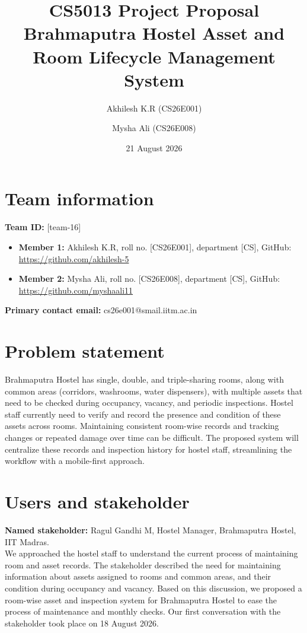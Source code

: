 \documentclass[11pt,a4paper]{article}
\title{CS5013 Project Proposal \\ Brahmaputra Hostel Asset and Room Lifecycle Management System}
\author{Akhilesh K.R (CS26E001) \and Mysha Ali (CS26E008)}
\date{21 August 2026}
\begin{document}
\maketitle

\section{Team information}
\textbf{Team ID:} [team-16]
\begin{itemize}[noitemsep]
    \item \textbf{Member 1:} Akhilesh K.R, roll no. [CS26E001], department [CS], GitHub: \url{https://github.com/akhilesh-5}
    \item \textbf{Member 2:} Mysha Ali, roll no. [CS26E008], department [CS], GitHub: \url{https://github.com/myshaali11}
\end{itemize}
\textbf{Primary contact email:} cs26e001@smail.iitm.ac.in

\section{Problem statement}
Brahmaputra Hostel has single, double, and triple-sharing rooms, along with common areas (corridors, washrooms, water dispensers), with multiple assets that need to be checked during occupancy, vacancy, and periodic inspections. Hostel staff currently need to verify and record the presence and condition of these assets across rooms. Maintaining consistent room-wise records and tracking changes or repeated damage over time can be difficult. The proposed system will centralize these records and inspection history for hostel staff, streamlining the workflow with a mobile-first approach.

\section{Users and stakeholder}
\textbf{Named stakeholder:} Ragul Gandhi M, Hostel Manager, Brahmaputra Hostel, IIT Madras. \\
We approached the hostel staff to understand the current process of maintaining room and asset records. The stakeholder described the need for maintaining information about assets assigned to rooms and common areas, and their condition during occupancy and vacancy. Based on this discussion, we proposed a room-wise asset and inspection system for Brahmaputra Hostel to ease the process of maintenance and monthly checks. Our first conversation with the stakeholder took place on 18 August 2026.
\end{document}
